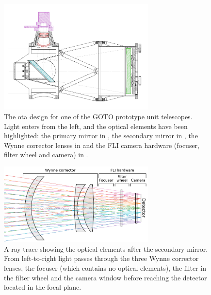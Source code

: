\begin{colsection}
\begin{colsection}
\newpage

\begin{figure}[p]
    \begin{center}
        \includegraphics[width=0.7\textwidth]{images/throughput/OTA_optics.png}
    \end{center}
    \caption[GOTO optical telescope assembly]{
        The \gls{ota} design for one of the GOTO prototype unit telescopes. Light enters from the left, and the optical elements have been highlighted: the primary mirror in , the secondary mirror in , the Wynne corrector lenses in  and the FLI camera hardware (focuser, filter wheel and camera) in .
    }\label{fig:ota}
\end{figure}

\begin{figure}[p]
    \begin{center}
        \includegraphics[width=0.7\textwidth]{images/throughput/wynne.pdf}
    \end{center}
    \caption[Ray tracing the corrector elements]{
        A ray trace showing the optical elements after the secondary mirror. From left-to-right light passes through the three Wynne corrector lenses, the focuser (which contains no optical elements), the filter in the filter wheel and the camera window before reaching the detector located in the focal plane.
    }\label{fig:wynne}
\end{figure}


\end{colsection}
\end{colsection}
